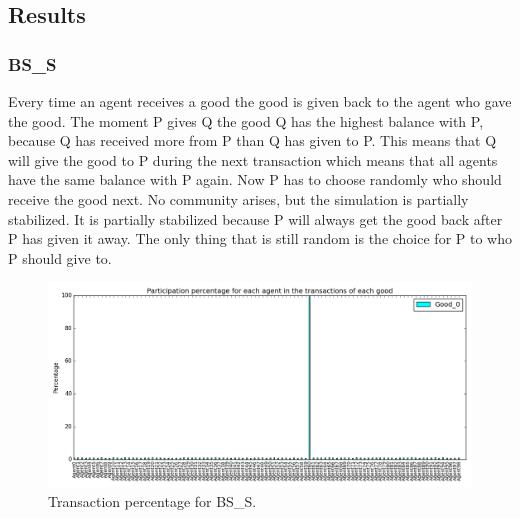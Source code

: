 \documentclass[twoside,openright]{uva-bachelor-thesis}
\begin{document}
\subsection{Results}

\subsubsection{BS\_S}
Every time an agent receives a good the good is given back to the agent who gave the good. The moment P gives Q the good Q has the highest balance with P, because Q has received more from P than Q has given to P. This means that Q will give the good to P during the next transaction which means that all agents have the same balance with P again. Now P has to choose randomly who should receive the good next. No community arises, but the simulation is partially stabilized. It is partially stabilized because P will always get the good back after P has given it away. The only thing that is still random is the choice for P to who P should give to. \\
\begin{figure}[h!]
\centering
\includegraphics[scale=0.4]{Simulation_figures/BR_BS_S/Figure1_10k}
\caption{Transaction percentage for BS\_S.}
\end{figure}
\end{document}

